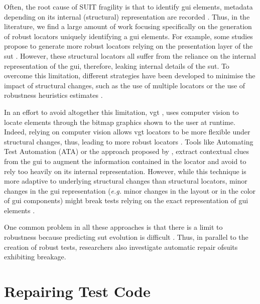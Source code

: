 Often, the root cause of SUIT fragility is that to identify \gls{gui} elements, metadata depending on its internal (structural) representation are recorded \cite{Daniel2011, Yandrapally2014, Hammoudi2016}. Thus, in the literature, we find a large amount of work focusing specifically on the generation of robust locators uniquely identifying a \gls{gui} elements. For example, some studies propose to generate more robust locators relying on the presentation layer of the \gls{sut} \cite{Montoto2011, Leotta2014, Leotta2015, Leotta2016, Zheng2018}. However, these structural locators all suffer from the reliance on the internal representation of the \gls{gui}, therefore, leaking internal details of the \gls{sut}. To overcome this limitation, different strategies have been developed to minimise the impact of structural changes, such as the use of multiple locators \cite{Leotta2015, Zheng2018, Long2020} or the use of robustness heuristics estimates \cite{Montoto2011, Leotta2014, Leotta2015, Leotta2015b}.

In an effort to avoid altogether this limitation, \gls{vgt} \cite{Bosch2014}, uses computer vision to locate elements through the bitmap graphics shown to the user at runtime. Indeed, relying on computer vision allows \gls{vgt} locators to be more flexible under structural changes, thus, leading to more robust locators \cite{Leotta2014b}. Tools like  Automating Test Automation (ATA) \cite{Thummalapenta2012, Thummalapenta2013} or the approach proposed by \textcite{Yandrapally2014}, extract contextual clues from the \gls{gui} to augment the information contained in the locator and avoid to rely too heavily on its internal representation. However, while this technique is more adaptive to underlying structural changes than structural locators, minor changes in the \gls{gui} representation (\emph{e.g.} minor changes in the layout or in the color of \gls{gui} components) might break tests relying on the exact representation of \gls{gui} elements \cite{Aldalur2017, Alegroth2018}.

One common problem in all these approaches is that there is a limit to robustness because predicting \gls{sut} evolution is difficult \cite{Kirinuki2019}. Thus, in parallel to the creation of robust tests, researchers also investigate automatic repair of\gls{suit}s exhibiting breakage.

\section{Repairing Test Code}
\label{sec:related-repair}

